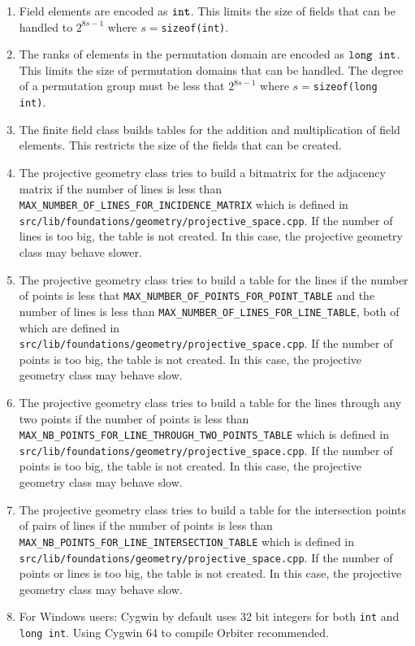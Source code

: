 \begin{enumerate}
\item
Field elements are encoded as  $\verb'int'$. This limits the size of fields that can be handled to $2^{8s-1}$ where $s=$\verb'sizeof(int)'.
\item
The ranks of elements in the permutation domain are encoded as  $\verb'long int'$. 
This limits the size of permutation domains that can be handled.
The degree of a permutation group must be less that $2^{8s-1}$ where $s=$\verb'sizeof(long int)'.
\item
The finite field class builds tables for the addition and multiplication of field elements. 
This restricts the size of the fields that can be created.
\item
The projective geometry class tries to build a bitmatrix for the adjacency matrix if the number of lines is less than 
\verb'MAX_NUMBER_OF_LINES_FOR_INCIDENCE_MATRIX' which is defined in \verb'src/lib/foundations/geometry/projective_space.cpp'. 
If the number of lines is too big, the table is not created. In this case, the projective geometry class may behave slower.
\item
The projective geometry class tries to build a table for the lines if the number of points is less that \verb'MAX_NUMBER_OF_POINTS_FOR_POINT_TABLE' and the number of 
lines is less than 
\verb'MAX_NUMBER_OF_LINES_FOR_LINE_TABLE', both of which are  defined in \verb'src/lib/foundations/geometry/projective_space.cpp'.
If the number of points is too big, the table is not created. In this case, the projective geometry class may behave slow.
\item
The projective geometry class tries to build a table for the lines through any two points if the number of points is less than 
\verb'MAX_NB_POINTS_FOR_LINE_THROUGH_TWO_POINTS_TABLE' which is defined in \verb'src/lib/foundations/geometry/projective_space.cpp'.
If the number of points is too big, the table is not created. In this case, the projective geometry class may behave slow.
\item
The projective geometry class tries to build a table for the intersection points of pairs of lines if the number of points is less than 
\verb'MAX_NB_POINTS_FOR_LINE_INTERSECTION_TABLE' which is defined in \verb'src/lib/foundations/geometry/projective_space.cpp'.
If the number of points or lines is too big, the table is not created. In this case, the projective geometry class may behave slow.
\item
For Windows users: Cygwin by default uses 32 bit integers for both \verb'int' and \verb'long int'. Using Cygwin 64 to compile Orbiter recommended.

\end{enumerate}
